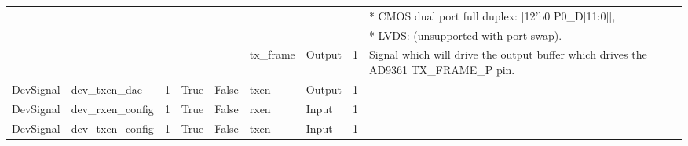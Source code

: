 \documentclass{article}
\begin{document}
\begin{landscape}
\begin{scriptsize}
\begin{tabular}{|p{1.75cm}|p{2.25cm}|p{1cm}|p{1cm}|p{1.25cm}|p{3cm}|p{1.4cm}|p{0.9cm}|p{7cm}|}
			                           &                                 &       &          &                       &                       &                            &                          & * CMOS dual port full duplex: [12'b0 P0\_D[11:0]], \\
			                           &                                 &       &          &                       &                       &                            &                          & * LVDS: (unsupported with port swap). \\
			\cline{6-9}
			&  &  &     &      &tx\_frame&Output&1& Signal which will drive the output buffer which drives the AD9361 TX\_FRAME\_P pin. \\
			\hline
			DevSignal                  & dev\_txen\_dac                  & 1     & True     & False                 & txen                  & Output                     & 1                        &  \\
			\hline
			DevSignal                  & dev\_rxen\_config               & 1     & True     & False                 & rxen                  & Input                      & 1                        &  \\
			\hline
			DevSignal                  & dev\_txen\_config               & 1     & True     & False                 & txen                  & Input                      & 1                        &  \\
			\hline
	    \end{tabular}
	\end{scriptsize}


\end{landscape}
\end{document}

